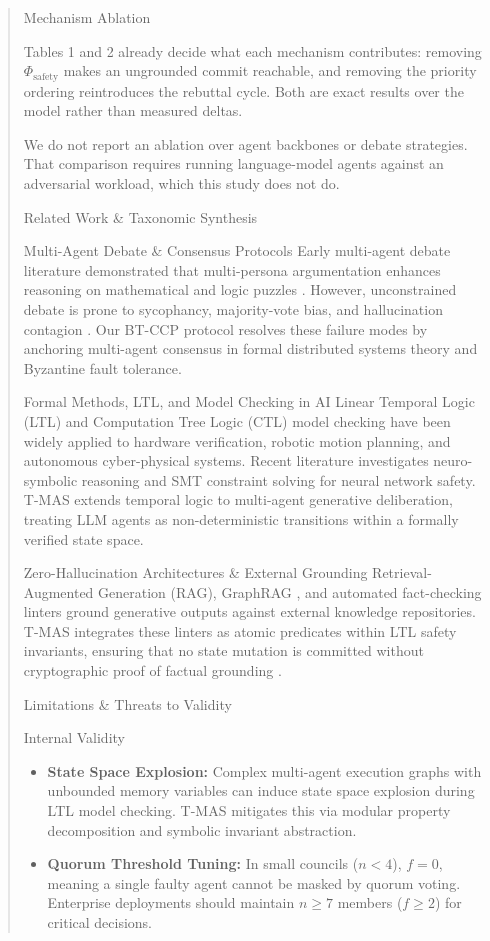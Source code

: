 \documentclass[10pt,journal,compsoc,twocolumn]{IEEEtran}
\begin{document}
\begin{quote}
{ Mechanism Ablation

Tables 1 and 2 already decide what each mechanism contributes: removing $\Phi_{\text{safety}}$ makes an ungrounded commit reachable, and removing the priority ordering reintroduces the rebuttal cycle. Both are exact results over the model rather than measured deltas.

We do not report an ablation over agent backbones or debate strategies. That comparison requires running language-model agents against an adversarial workload, which this study does not do.



 Related Work \& Taxonomic Synthesis

 Multi-Agent Debate \& Consensus Protocols
Early multi-agent debate literature demonstrated that multi-persona argumentation enhances reasoning on mathematical and logic puzzles \cite{arxiv_2005_14165,arxiv_2203_02155}. However, unconstrained debate is prone to sycophancy, majority-vote bias, and hallucination contagion \cite{arxiv_2406_00584}. Our BT-CCP protocol resolves these failure modes by anchoring multi-agent consensus in formal distributed systems theory and Byzantine fault tolerance.

 Formal Methods, LTL, and Model Checking in AI
Linear Temporal Logic (LTL) and Computation Tree Logic (CTL) model checking have been widely applied to hardware verification, robotic motion planning, and autonomous cyber-physical systems. Recent literature investigates neuro-symbolic reasoning and SMT constraint solving for neural network safety. T-MAS extends temporal logic to multi-agent generative deliberation, treating LLM agents as non-deterministic transitions within a formally verified state space.

 Zero-Hallucination Architectures \& External Grounding
Retrieval-Augmented Generation (RAG), GraphRAG \cite{arxiv_2501_14050}, and automated fact-checking linters ground generative outputs against external knowledge repositories. T-MAS integrates these linters as atomic predicates within LTL safety invariants, ensuring that no state mutation is committed without cryptographic proof of factual grounding \cite{arxiv_2405_01543,crossref_10_1201_9788743808145_14}.



 Limitations \& Threats to Validity

 Internal Validity
\begin{itemize}
  \item \textbf{State Space Explosion:} Complex multi-agent execution graphs with unbounded memory variables can induce state space explosion during LTL model checking. T-MAS mitigates this via modular property decomposition and symbolic invariant abstraction.
  \item \textbf{Quorum Threshold Tuning:} In small councils ($n < 4$), $f = 0$, meaning a single faulty agent cannot be masked by quorum voting. Enterprise deployments should maintain $n \ge 7$ members ($f \ge 2$) for critical decisions.
\end{itemize}

}
\end{quote}
\end{document}
